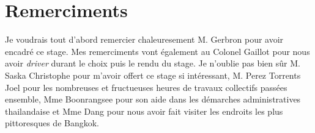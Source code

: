 \section*{Remerciments}

Je voudrais tout d'abord remercier chaleuresement M. Gerbron pour avoir encadré ce stage. Mes remerciments vont également au Colonel Gaillot pour nous avoir \textit{driver} durant le choix puis le rendu du stage. Je n'oublie pas bien sûr M. Saska Christophe pour m'avoir offert ce stage si intéressant, M.  Perez Torrents Joel pour les nombreuses et fructueuses heures de travaux collectifs passées ensemble, Mme Boonrangsee pour son aide dans les démarches administratives thailandaise et Mme Dang pour nous avoir fait visiter les endroits les plus pittoresques de Bangkok.

